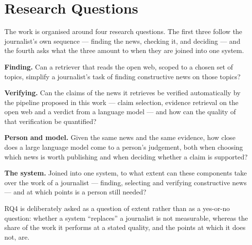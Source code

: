 

\section{Research Questions}
\label{sec:research-questions}

The work is organised around four research questions. The first three
follow the journalist's own sequence --- finding the news, checking
it, and deciding --- and the fourth asks what the three amount to
when they are joined into one system.

\begin{description}[leftmargin=1.2cm,labelwidth=1cm]
    \item[RQ1] \textbf{Finding.} Can a retriever that reads the open
    web, scoped to a chosen set of topics, simplify a journalist's
    task of finding constructive news on those topics?
    \item[RQ2] \textbf{Verifying.} Can the claims of the news it
    retrieves be verified automatically by the pipeline proposed in
    this work --- claim selection, evidence retrieval on the open web
    and a verdict from a language model --- and how can the quality
    of that verification be quantified?
    \item[RQ3] \textbf{Person and model.} Given the same news and the
    same evidence, how close does a large language model come to a
    person's judgement, both when choosing which news is worth
    publishing and when deciding whether a claim is supported?
    \item[RQ4] \textbf{The system.} Joined into one system, to what
    extent can these components take over the work of a journalist
    --- finding, selecting and verifying constructive news --- and
    at which points is a person still needed?
\end{description}

RQ4 is deliberately asked as a question of extent rather than as a
yes-or-no question: whether a system ``replaces'' a journalist is not
measurable, whereas the share of the work it performs at a stated
quality, and the points at which it does not, are.
